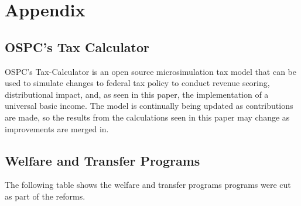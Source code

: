 \documentclass{article}
\begin{document}
\newpage
\section{Appendix}

\subsection{OSPC's Tax Calculator}
OSPC’s Tax-Calculator is an open source microsimulation tax model that can be used to simulate changes to federal tax policy to conduct revenue scoring, distributional impact, and, as seen in this paper, the implementation of a universal basic income. The model is continually being updated as contributions are made, so the results from the calculations seen in this paper may change as improvements are merged in.

\subsection{Welfare and Transfer Programs}
The following table shows the welfare and transfer programs programs were cut as part of the reforms. 
\end{document}
